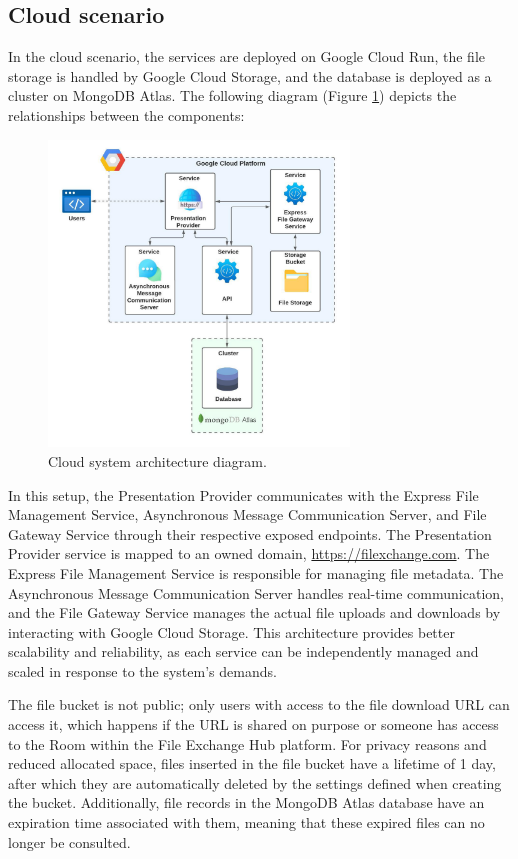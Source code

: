 \documentclass[a4paper,fleqn]{cas-dc}
\begin{document}
\subsection{Cloud scenario}
In the cloud scenario, the services are deployed on Google Cloud Run, the file storage is handled by Google Cloud Storage, and the database is deployed as a cluster on MongoDB Atlas. The following diagram (Figure \ref{fig:architectureCloud}) depicts the relationships between the components:

\begin{figure}[htb]
\centering
\includegraphics[width=8cm]{CloudArch.jpeg}
\caption{Cloud system architecture diagram.}
\label{fig:architectureCloud}
\end{figure}

In this setup, the Presentation Provider communicates with the Express File Management Service, Asynchronous Message Communication Server, and File Gateway Service through their respective exposed endpoints. The Presentation Provider service is mapped to an owned domain, \url{https://filexchange.com}. The Express File Management Service is responsible for managing file metadata. The Asynchronous Message Communication Server handles real-time communication, and the File Gateway Service manages the actual file uploads and downloads by interacting with Google Cloud Storage. This architecture provides better scalability and reliability, as each service can be independently managed and scaled in response to the system's demands.

The file bucket is not public; only users with access to the file download URL can access it, which happens if the URL is shared on purpose or someone has access to the Room within the File Exchange Hub platform. For privacy reasons and reduced allocated space, files inserted in the file bucket have a lifetime of 1 day, after which they are automatically deleted by the settings defined when creating the bucket. Additionally, file records in the MongoDB Atlas database have an expiration time associated with them, meaning that these expired files can no longer be consulted.
\end{document}
